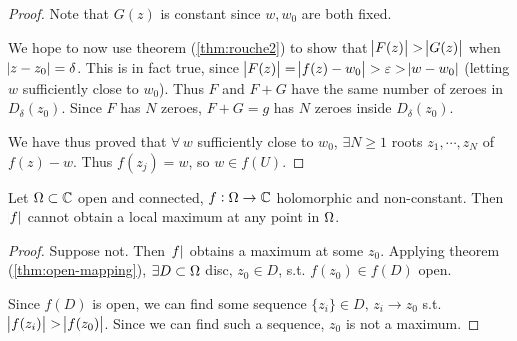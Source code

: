 \begin{proof}
Note that $G(z)$ is constant since $w,w_0$ are both fixed.

We hope to now use theorem (\ref{thm:rouche2}) to show that $\abs{F(z)} > \abs{G(z)} $ when $\abs{z-z_0} = \delta$. This is in fact true, since $\abs{F(z)} = \abs{f(z)-w_0} > \varepsilon > \abs{w-w_0}$ (letting $w$ sufficiently close to $w_0$). Thus $F$ and $F+G$ have the same number of zeroes in $D_\delta (z_0)$. Since $F$ has $N$ zeroes, $F+G = g$ has $N$ zeroes inside $D_\delta (z_0)$.


We have thus proved that $\forall \, w$ sufficiently close to $w_0$, $\exists N \geq 1$ roots $z_1, \cdots , z_N$ of $f(z) - w$. Thus $f(z_j) = w$, so $w \in f(U)$.
\end{proof}


\begin{corollary}\label{cor:max-mod-prin1}


Let $\Omega \subset \mathbb{C}$ open and connected, $f:\Omega \rightarrow \mathbb{C}$ holomorphic and non-constant. Then $\abs{f}$ cannot obtain a local maximum at any point in $\Omega$.
\end{corollary}


\begin{proof}
Suppose not. Then $\abs{f}$ obtains a maximum at some $z_0$. Applying theorem (\ref{thm:open-mapping}), $\exists D \subset \Omega$ disc, $ z_0 \in D $, s.t. $f(z_0) \in f(D)$ open.

\begin{center}
\end{center}

Since $f(D)$ is open, we can find some sequence $ \{ z_i \} \in D, \, z_i \to z_0 $ s.t. $\abs{f(z_i)} > \abs{f(z_0)}$. Since we can find such a sequence, $z_0$ is not a maximum.
\end{proof}

